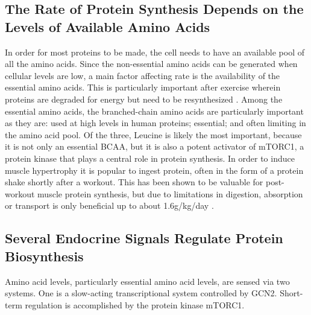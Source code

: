 \documentclass{tufte-handout}
\begin{document}
\subsection{The Rate of Protein Synthesis Depends on the Levels of Available Amino Acids}

In order for most proteins to be made, the cell needs to have an available pool of all the amino acids.  Since the non-essential amino acids can be generated when cellular levels are low, a main factor affecting rate is the availability of the essential amino acids.  This is particularly important after exercise wherein proteins are degraded for energy but need to be resynthesized \citep{Tipton1999}.  Among the essential amino acids, the branched-chain amino acids are particularly important as they are: used at high levels in human proteins; essential; and often limiting in the amino acid pool.  Of the three, Leucine is likely the most important, because it is not only an essential BCAA, but it is also a potent activator of mTORC1, a protein kinase that plays a central role in protein synthesis.   In order to induce muscle hypertrophy it is popular to ingest protein, often in the form of a protein shake shortly after a workout.  This has been shown to be valuable for post-workout muscle protein synthesis, but due to limitations in digestion, absorption or transport is only beneficial up to about 1.6g/kg/day \citep{Morton2017}.

\subsection{Several Endocrine Signals Regulate Protein Biosynthesis}

Amino acid levels, particularly essential amino acid levels, are sensed via two systems.  One is a slow-acting transcriptional system controlled by GCN2.  Short-term regulation is accomplished by the protein kinase mTORC1.
\end{document}
